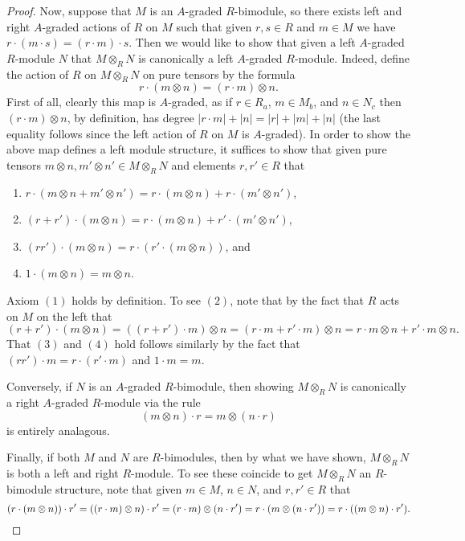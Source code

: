 \documentclass[../main.tex]{subfiles}
\begin{document}
\begin{proof}
	Now, suppose that $M$ is an $A$-graded $R$-bimodule, so there exists left and right $A$-graded actions of $R$ on $M$ such that given $r,s\in R$ and $m\in M$ we have $r\cdot(m\cdot s)=(r\cdot m)\cdot s$. Then we would like to show that given a left $A$-graded $R$-module $N$ that $M\otimes_RN$ is canonically a left $A$-graded $R$-module. Indeed, define the action of $R$ on $M\otimes_RN$ on pure tensors by the formula
	\[r\cdot(m\otimes n)=(r\cdot m)\otimes n.\]
	First of all, clearly this map is $A$-graded, as if $r\in R_a$, $m\in M_b$, and $n\in N_c$ then $(r\cdot m)\otimes n$, by definition, has degree $|r\cdot m|+|n|=|r|+|m|+|n|$ (the last equality follows since the left action of $R$ on $M$ is $A$-graded). In order to show the above map defines a left module structure, it suffices to show that given pure tensors $m\otimes n,m'\otimes n'\in M\otimes_RN$ and elements $r,r'\in R$ that
	\begin{enumerate}
		\item $r\cdot(m\otimes n+m'\otimes n')=r\cdot(m\otimes n)+r\cdot( m'\otimes n')$,
		\item $(r+r')\cdot(m\otimes n)=r\cdot(m\otimes n)+r'\cdot(m'\otimes n')$,
		\item $(rr')\cdot(m\otimes n)=r\cdot(r'\cdot(m\otimes n))$, and
		\item $1\cdot (m\otimes n)=m\otimes n$.
	\end{enumerate}
	Axiom $(1)$ holds by definition. To see $(2)$, note that by the fact that $R$ acts on $M$ on the left that
	\[(r+r')\cdot(m\otimes n)=((r+r')\cdot m)\otimes n=(r\cdot m+r'\cdot m)\otimes n=r\cdot m\otimes n+r'\cdot m\otimes n.\]
	That $(3)$ and $(4)$ hold follows similarly by the fact that $(rr')\cdot m=r\cdot(r'\cdot m)$ and $1\cdot m=m$.

	Conversely, if $N$ is an $A$-graded $R$-bimodule, then showing $M\otimes_RN$ is canonically a right $A$-graded $R$-module via the rule
	\[(m\otimes n)\cdot r=m\otimes(n\cdot r)\]
	is entirely analagous.

	Finally, if both $M$ and $N$ are $R$-bimodules, then by what we have shown, $M\otimes_RN$ is both a left and right $R$-module. To see these coincide to get $M\otimes_RN$ an $R$-bimodule structure, note that given $m\in M$, $n\in N$, and $r,r'\in R$ that
	\[(r\cdot(m\otimes n))\cdot r'=((r\cdot m)\otimes n)\cdot r'=(r\cdot m)\otimes(n\cdot r')=r\cdot(m\otimes(n\cdot r'))=r\cdot((m\otimes n)\cdot r').\qedhere\]
\end{proof}
\end{document}
